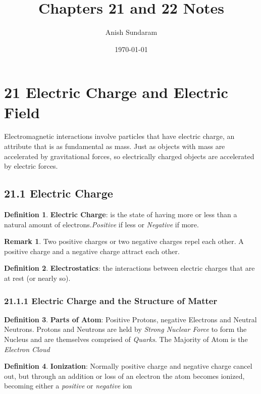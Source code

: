 \documentclass[12pt]{amsart}
\title{Chapters 21 and 22 Notes}
\author{Anish Sundaram}
\date{\today}
\theoremstyle{definition}
\newtheorem{definition}{Definition} %
\newtheorem*{remark}{Remark}        %
\numberwithin{equation}{theorem}    %
\begin{document}
\maketitle

\tableofcontents

\section*{21 Electric Charge and Electric Field}
Electromagnetic interactions involve particles that have electric charge, 
an attribute that is as fundamental as mass. Just as objects with mass are 
accelerated by gravitational forces, so electrically charged objects are 
accelerated by electric forces.


\subsection*{21.1 Electric Charge}
\begin{definition}
    \textbf{Electric Charge}: 
    is the state of having more or less than a natural
    amount of electrons.\textit{Positive} if less or \textit{Negative} if more. 
    \begin{remark}
        Two positive charges or two negative charges repel each other. A 
        positive charge and a negative charge attract each other.
    \end{remark}
\end{definition}

\begin{definition}
    \textbf{Electrostatics}: 
    the interactions between electric charges that are 
    at rest (or nearly so).
\end{definition}

\subsubsection*{21.1.1 Electric Charge and the Structure of Matter}

\begin{definition}
    \textbf{Parts of Atom}: 
    Positive Protons, negative Electrons and Neutral 
    Neutrons. Protons and Neutrons are held by \textit{Strong Nuclear Force} 
    to form the Nucleus and are themselves comprised of \textit{Quarks}. 
    The Majority of Atom is the \textit{Electron Cloud}
\end{definition}

\begin{definition}
    \textbf{Ionization}: 
    Normally positive charge and negative charge cancel 
    out, but through an addition or loss of an electron the atom becomes 
    ionized, becoming either a \textit{positive} or \textit{negative} ion 
\end{definition}
\end{document}
